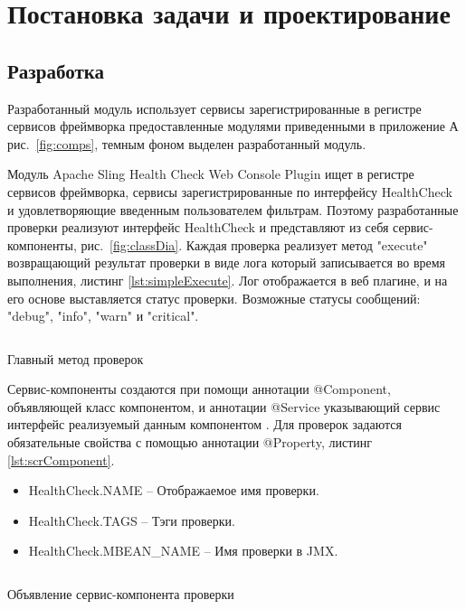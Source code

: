 \chapter{Постановка задачи и проектирование}
\label{cha:design}


\section{Разработка}

Разработанный модуль использует сервисы зарегистрированные в регистре сервисов фреймворка предоставленные модулями приведенными в приложение А рис.~\ref{fig:comps}, темным фоном выделен разработанный модуль.

Модуль Apache Sling Health Check Web Console Plugin ищет в регистре сервисов фреймворка, сервисы зарегистрированные по интерфейсу HealthCheck и удовлетворяющие введенным пользователем фильтрам. Поэтому разработанные проверки реализуют интерфейс HealthCheck и представляют из себя сервис-компоненты, рис.~\ref{fig:classDia}. Каждая проверка реализует метод "execute" возвращающий результат проверки в виде лога который записывается во время выполнения, листинг \ref{lst:simpleExecute}. Лог отображается в веб плагине, и на его основе выставляется статус проверки. Возможные статусы сообщений: "debug", "info", "warn" и "critical".

\begin{listing}[H]
\inputminted[linenos,frame=single]{java}{inc/src/simpleExecute}
\caption{Главный метод проверок} 
\label{lst:simpleExecute}
\end{listing}

Сервис-компоненты создаются при помощи аннотации @Component, объявляющей класс компонентом, и аннотации @Service указывающий сервис интерфейс реализуемый данным компонентом \cite{web:felixScr}. Для проверок задаются обязательные свойства с помощью аннотации @Property, листинг \ref{lst:scrComponent}.
\begin{itemize}
\item HealthCheck.NAME – Отображаемое имя проверки.
\item HealthCheck.TAGS – Тэги проверки.
\item HealthCheck.MBEAN\_NAME – Имя проверки в JMX.
\end{itemize}

\begin{listing}[H]
\inputminted[linenos,frame=single]{java}{inc/src/scrComponent}
\caption{Объявление сервис-компонента проверки} 
\label{lst:scrComponent}
\end{listing}

